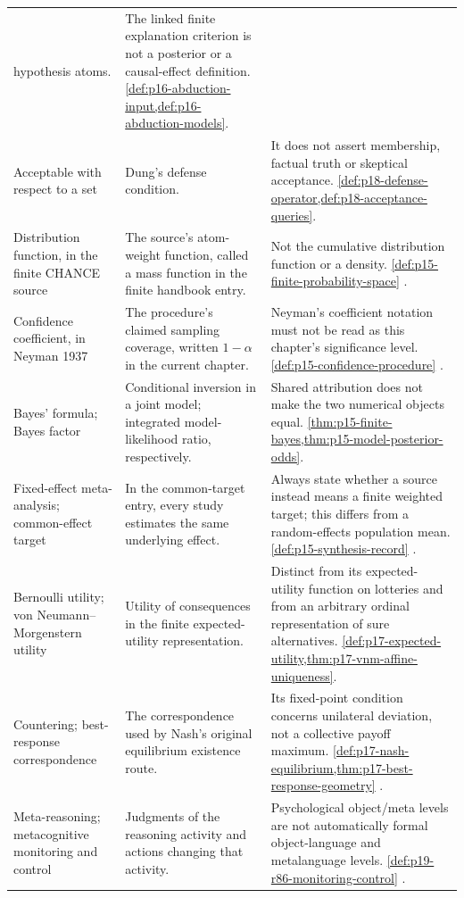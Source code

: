 \begin{longtable}{@{}p{}p{}p{}@{}}
hypothesis atoms. & The linked finite explanation criterion is not a
posterior or a causal-effect definition.
\cref{def:p16-abduction-input,def:p16-abduction-models}. \\
Acceptable with respect to a set & Dung's defense condition. & It does not
assert membership, factual truth or skeptical acceptance.
\cref{def:p18-defense-operator,def:p18-acceptance-queries}. \\
Distribution function, in the finite CHANCE source & The source's
atom-weight function, called a mass function in the finite handbook entry. &
Not the cumulative distribution function or a density.
\cref{def:p15-finite-probability-space}
\cite{GrinsteadSnellChance2006}. \\
Confidence coefficient, in Neyman 1937 & The procedure's claimed
sampling coverage, written \(1-\alpha\) in the current chapter. &
Neyman's coefficient notation must not be read as this chapter's
significance level. \cref{def:p15-confidence-procedure}
\cite{Neyman1937Confidence}. \\
Bayes' formula; Bayes factor & Conditional inversion in a joint model;
integrated model-likelihood ratio, respectively. & Shared attribution
does not make the two numerical objects equal.
\cref{thm:p15-finite-bayes,thm:p15-model-posterior-odds}. \\
Fixed-effect meta-analysis; common-effect target & In the common-target
entry, every study estimates the same underlying effect. & Always state
whether a source instead means a finite weighted target; this differs
from a random-effects population mean.
\cref{def:p15-synthesis-record}
\cite{DeeksEtAl2024Cochrane10}. \\
Bernoulli utility; von Neumann--Morgenstern utility & Utility of consequences
in the finite expected-utility representation. & Distinct from its
expected-utility function on lotteries and from an arbitrary ordinal
representation of sure alternatives.
\cref{def:p17-expected-utility,thm:p17-vnm-affine-uniqueness}. \\
Countering; best-response correspondence & The correspondence used by
Nash's original equilibrium existence route. & Its fixed-point condition
concerns unilateral deviation, not a collective payoff maximum.
\cref{def:p17-nash-equilibrium,thm:p17-best-response-geometry}
\cite{Nash1950EquilibriumPoints,Nash1951NonCooperative}. \\
Meta-reasoning; metacognitive monitoring and control & Judgments of the
reasoning activity and actions changing that activity. & Psychological
object/meta levels are not automatically formal object-language and
metalanguage levels. \cref{def:p19-r86-monitoring-control}
\cite{ThompsonElqayamAckerman2021MetaReasoning}. \\
\bottomrule
\end{longtable}

